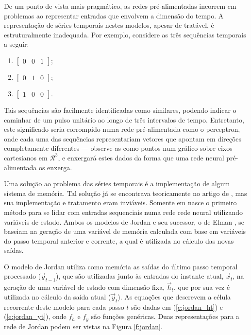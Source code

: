       De um ponto de vista mais pragmático, as redes pré-alimentadas incorrem em problemas ao representar entradas que envolvem a dimensão do tempo. A representação de séries temporais nestes modelos, apesar de tratável, é estruturalmente inadequada. Por exemplo, considere as três sequências temporais a seguir:

      \begin{enumerate} \centering
        \item $\begin{bmatrix} 0 & 0 & 1 \end{bmatrix}$;
        \item $\begin{bmatrix} 0 & 1 & 0 \end{bmatrix}$;
        \item $\begin{bmatrix} 1 & 0 & 0 \end{bmatrix}$.
      \end{enumerate}

      \noindent Tais sequências são facilmente identificadas como similares, podendo indicar o caminhar de um pulso unitário ao longo de três intervalos de tempo. Entretanto, este significado seria corrompido numa rede pré-alimentada como o perceptron, onde cada uma das sequências representariam vetores que apontam em direções completamente diferentes --- observe-as como pontos num gráfico sobre eixos cartesianos em $\mathcal{R}^3$, e enxergará estes dados da forma que uma rede neural pré-alimentada os enxerga.

      Uma solução ao problema das séries temporais é a implementação de algum sistema de memória. Tal solução já se encontrava teoricamente no artigo de , mas sua implementação e tratamento eram inviáveis. Somente em  nasce o primeiro método para se lidar com entradas sequenciais numa rede rede neural utilizando variáveis de estado. Ambos os modelos de Jordan \citeyear{jordan1986serial} e seu sucessor, o de Elman \citeyear{elman1990finding}, se baseiam na geração de uma variável de memória calculada com base em variáveis do passo temporal anterior e corrente, a qual é utilizada no cálculo das novas saídas.

      O modelo de Jordan utiliza como memória as saídas do último passo temporal processado ($\vec{y}_{t-1}$), que são utilizadas junto às entradas do instante atual, $\vec{x}_t$, na geração de uma variável de estado com dimensão fixa, $\vec{h}_t$, que por sua vez é utilizada no cálculo da saída atual ($\vec{y}_t$). As equações que descrevem a célula recorrente deste modelo para cada passo $t$ são dadas em (\ref{e:jordan_ht}) e (\ref{e:jordan_yt}), onde $f_h$ e $f_y$ são funções genéricas. Duas representações para a rede de Jordan podem ser vistas na Figura \ref{f:jordan}.

